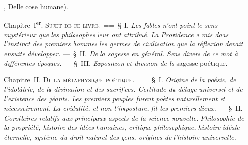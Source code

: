 \documentclass[french,twoside]{book} %
\newcommand\chaptercont{} %
\begin{document}
\chaptercont
{}, Delle cose humane).\par
Chapitre I\textsuperscript{er}. {\scshape Sujet de ce livre}. == § I. {\itshape Les fables n’ont point le sens mystérieux que les philosophes leur ont attribué. La Providence a mis dans l’instinct des premiers hommes les germes de civilisation que la réflexion devait ensuite développer.} — § II. {\itshape De la sagesse en général. Sens divers de ce mot à différentes époques.} — § III. {\itshape Exposition et division de la} sagesse poétique.\par
 Chapitre {\scshape II. De la métaphysique poétique.} == § I. {\itshape Origine de la poésie, de l’idolâtrie, de la divination et des sacrifices. Certitude du déluge universel et de l’existence des géants. Les premiers peuples furent poètes naturellement et nécessairement. La crédulité, et non l’imposture, fit les premiers dieux.} — § II. {\itshape Corollaires relatifs aux principaux aspects de la science nouvelle. Philosophie de la propriété, histoire des idées humaines, critique philosophique, histoire idéale éternelle, système du droit naturel des gens, origines de l’histoire universelle.}\par
\end{document}
